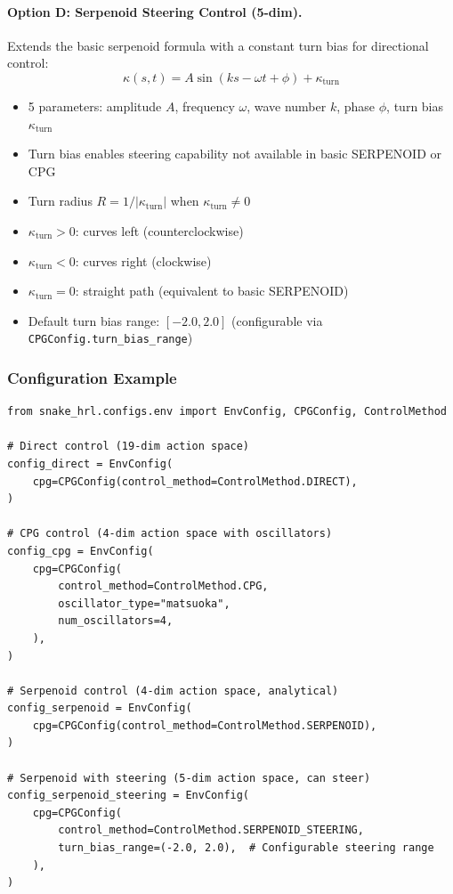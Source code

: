 \documentclass[11pt]{article}
\begin{document}
\paragraph{Option D: Serpenoid Steering Control (5-dim).}
Extends the basic serpenoid formula with a constant turn bias for directional control:
\begin{equation}
    \kappa(s, t) = A \sin(ks - \omega t + \phi) + \kappa_{\text{turn}}
\end{equation}
\begin{itemize}
    \item 5 parameters: amplitude $A$, frequency $\omega$, wave number $k$, phase $\phi$, turn bias $\kappa_{\text{turn}}$
    \item Turn bias enables steering capability not available in basic SERPENOID or CPG
    \item Turn radius $R = 1/|\kappa_{\text{turn}}|$ when $\kappa_{\text{turn}} \neq 0$
    \item $\kappa_{\text{turn}} > 0$: curves left (counterclockwise)
    \item $\kappa_{\text{turn}} < 0$: curves right (clockwise)
    \item $\kappa_{\text{turn}} = 0$: straight path (equivalent to basic SERPENOID)
    \item Default turn bias range: $[-2.0, 2.0]$ (configurable via \texttt{CPGConfig.turn\_bias\_range})
\end{itemize}

\subsubsection{Configuration Example}

\begin{listing}[H]
\begin{verbatim}
from snake_hrl.configs.env import EnvConfig, CPGConfig, ControlMethod

# Direct control (19-dim action space)
config_direct = EnvConfig(
    cpg=CPGConfig(control_method=ControlMethod.DIRECT),
)

# CPG control (4-dim action space with oscillators)
config_cpg = EnvConfig(
    cpg=CPGConfig(
        control_method=ControlMethod.CPG,
        oscillator_type="matsuoka",
        num_oscillators=4,
    ),
)

# Serpenoid control (4-dim action space, analytical)
config_serpenoid = EnvConfig(
    cpg=CPGConfig(control_method=ControlMethod.SERPENOID),
)

# Serpenoid with steering (5-dim action space, can steer)
config_serpenoid_steering = EnvConfig(
    cpg=CPGConfig(
        control_method=ControlMethod.SERPENOID_STEERING,
        turn_bias_range=(-2.0, 2.0),  # Configurable steering range
    ),
)
\end{verbatim}
\caption{Selecting Control Method}
\end{listing}
\end{document}
